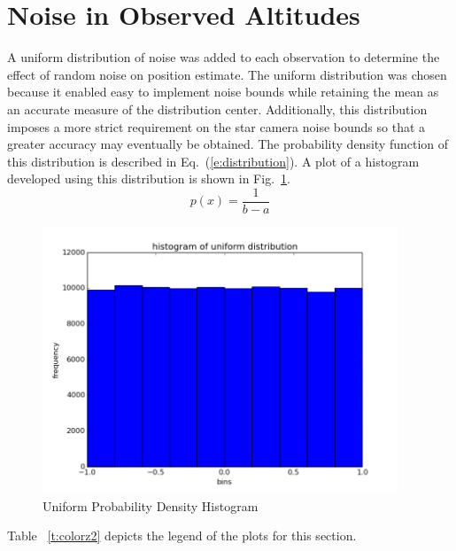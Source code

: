 \documentclass[12pt,a4paper]{book}
\begin{document}
\section{Noise in Observed Altitudes}
A uniform distribution of noise was added to each observation to determine the effect of random noise on position estimate.  The uniform distribution was chosen because it enabled easy to implement noise bounds while retaining the mean as an accurate measure of the distribution center.  Additionally, this distribution imposes a more strict requirement on the star camera noise bounds so that a greater accuracy may eventually be obtained.  The probability density function of this distribution is described in Eq.~(\ref{e:distribution}).  A plot of a histogram developed using this distribution is shown in Fig.~\ref{f:uniHist}.  
\begin{equation}
p(x) = \frac{1}{b-a}
\label{e:distribution}
\end{equation}

\begin{figure}[!h]%
\centering
\includegraphics[height=8cm]{uniHist.png}
\caption{Uniform Probability Density Histogram}
\label{f:uniHist}
\end{figure}
\FloatBarrier
Table ~\ref{t:colorz2} depicts the legend of the plots for this section.
\end{document}
